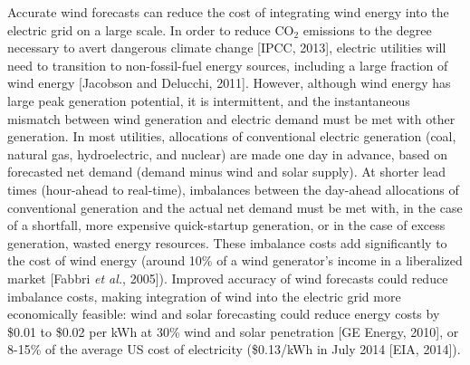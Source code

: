 Accurate wind forecasts can reduce the cost of integrating wind energy into the electric grid on a large scale.  In order to reduce CO$_2$ emissions to the degree necessary to avert dangerous climate change [IPCC, 2013], electric utilities will need to transition to non-fossil-fuel energy sources, including a large fraction of wind energy [Jacobson and Delucchi, 2011].  However, although wind energy has large peak generation potential, it is intermittent, and the instantaneous mismatch between wind generation and electric demand must be met with other generation.  In most utilities, allocations of conventional electric generation (coal, natural gas, hydroelectric, and nuclear) are made one day in advance, based on forecasted net demand (demand minus wind and solar supply).  At shorter lead times (hour-ahead to real-time), imbalances between the day-ahead allocations of conventional generation and the actual net demand must be met with, in the case of a shortfall, more expensive quick-startup generation, or in the case of excess generation, wasted energy resources.  These imbalance costs add significantly to the cost of wind energy (around 10\% of a wind generator's income in a liberalized market [Fabbri \textit{et al.}, 2005]).  Improved accuracy of wind forecasts could reduce imbalance costs, making integration of wind into the electric grid more economically feasible: wind and solar forecasting could reduce energy costs by \$0.01 to \$0.02 per kWh at 30\% wind and solar penetration [GE Energy, 2010], or 8-15\% of the average US cost of electricity (\$0.13/kWh in July 2014 [EIA, 2014]).


